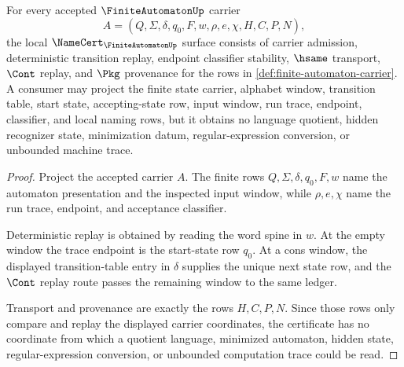 \begin{theorem}
\label{thm:finite-automaton-namecert-obligations}
For every accepted $\FiniteAutomatonUp$ carrier
$$
A=(Q,\Sigma,\delta,q_0,F,w,\rho,e,\chi,H,C,P,N),
$$
the local $\NameCert_{\FiniteAutomatonUp}$ surface consists of carrier
admission, deterministic transition replay, endpoint classifier stability,
$\hsame$ transport, $\Cont$ replay, and $\Pkg$ provenance for the rows in
\autoref{def:finite-automaton-carrier}. A consumer may project the finite
state carrier, alphabet window, transition table, start state, accepting-state
row, input window, run trace, endpoint, classifier, and local naming rows, but
it obtains no language quotient, hidden recognizer state, minimization datum,
regular-expression conversion, or unbounded machine trace.
\end{theorem}
\begin{proof}
Project the accepted carrier $A$. The finite rows $Q,\Sigma,\delta,q_0,F,w$
name the automaton presentation and the inspected input window, while
$\rho,e,\chi$ name the run trace, endpoint, and acceptance classifier.

Deterministic replay is obtained by reading the word spine in $w$. At the
empty window the trace endpoint is the start-state row $q_0$. At a cons window,
the displayed transition-table entry in $\delta$ supplies the unique next state
row, and the $\Cont$ replay route passes the remaining window to the same
ledger.

Transport and provenance are exactly the rows $H,C,P,N$. Since those rows only
compare and replay the displayed carrier coordinates, the certificate has no
coordinate from which a quotient language, minimized automaton, hidden state,
regular-expression conversion, or unbounded computation trace could be read.
\end{proof}

